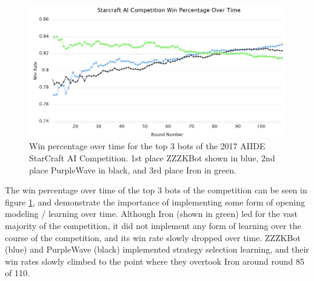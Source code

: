 \begin{figure}[t]
  \centering
  \includegraphics[width=1\columnwidth]{fig/aiideWinPerc.png}
  \caption{Win percentage over time for the top 3 bots of the 2017 AIIDE StarCraft AI Competition. 1st place ZZZKBot shown in blue, 2nd place PurpleWave in black, and 3rd place Iron in green. }
  \label{aiideWinPerc}
\end{figure}

The win percentage over time of the top 3 bots of the competition can be seen in figure \ref{aiideWinPerc}, and demonstrate the importance of implementing some form of opening modeling / learning over time. Although Iron (shown in green) led for the vast majority of the competition, it did not implement any form of learning over the course of the competition, and its win rate slowly dropped over time. ZZZKBot (blue) and PurpleWave (black) implemented strategy selection learning, and their win rates slowly climbed to the point where they overtook Iron around round 85 of 110. 
